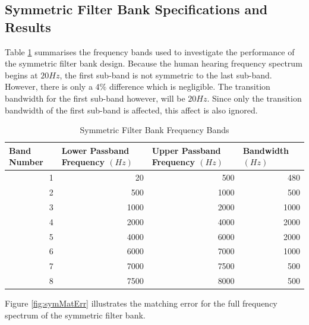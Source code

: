 \documentclass[11pt,onecolumn]{witseiepaper}
\begin{document}
\begin{appendices}
\section{Symmetric Filter Bank Specifications and Results} 
\label{app:symFreqBands}

\noindent Table \ref{tab:symFreqBand} summarises the frequency bands used to investigate the performance of the symmetric filter bank design. Because the human hearing frequency spectrum begins at $20Hz$, the first sub-band is not symmetric to the last sub-band. However, there is only a $4\%$ difference which is negligible. The transition bandwidth for the first sub-band however, will be $20Hz$. Since only the transition bandwidth of the first sub-band is affected, this affect is also ignored.

\begin{table}[htbp]
  \centering
  \caption{Symmetric Filter Bank Frequency Bands}
  \begin{adjustbox}{width=0.9\linewidth}
    \begin{tabular}{|r|r|r|r|}
    \hline
    \multicolumn{1}{|l|}{\textbf{Band Number}} & \multicolumn{1}{l|}{\textbf{Lower Passband Frequency $(Hz)$}} & \multicolumn{1}{l|}{\textbf{Upper Passband Frequency $(Hz)$}} & \multicolumn{1}{l|}{\textbf{Bandwidth $(Hz)$}} \\
    \hline
    1     & 20    & 500   & 480 \\
    \hline
    2     & 500   & 1000  & 500 \\
    \hline
    3     & 1000  & 2000  & 1000 \\
    \hline
    4     & 2000  & 4000  & 2000 \\
    \hline
    5     & 4000  & 6000  & 2000 \\
    \hline
    6     & 6000  & 7000  & 1000 \\
    \hline
    7     & 7000  & 7500  & 500 \\
    \hline
    8     & 7500  & 8000  & 500 \\
    \hline
    \end{tabular}%
    \end{adjustbox}
  \label{tab:symFreqBand}%
\end{table}%

\noindent Figure \ref{fig:symMatErr} illustrates the matching error for the full frequency spectrum of the symmetric filter bank.


\end{appendices}
\end{document}
